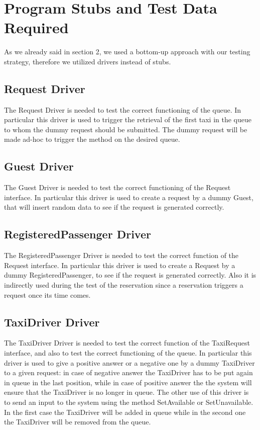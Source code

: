 \section{Program Stubs and Test Data Required}
As we already said in section 2, we used a bottom-up approach with our testing strategy,
therefore we utilized drivers instead of stubs.
\subsection{Request Driver}
The Request Driver is needed to test the correct functioning of the queue. In particular this driver
is used to trigger the retrieval of the first taxi in the queue to whom the dummy request should be
submitted. The dummy request will be made ad-hoc to trigger the method on the desired queue.
\subsection{Guest Driver}
The Guest Driver is needed to test the correct functioning of the Request interface. In particular
this driver is used to create a request by a dummy Guest, that will insert random data to see if the request
is generated correctly.
\subsection{RegisteredPassenger Driver}
The RegisteredPassenger Driver is needed to test the correct function of the Request interface.
In particular this driver is used to create a Request by a dummy RegisteredPassenger,
to see if the request is generated correctly. Also it is indirectly used during the test of
the reservation since a reservation triggers a request once its time comes.
\subsection{TaxiDriver Driver}
The TaxiDriver Driver is needed to test the correct function of the TaxiRequest interface, and also to
test the correct functioning of the queue. In particular this driver is used to give a positive answer or a negative one
by a dummy TaxiDriver to a given request: in case of negative answer the TaxiDriver has to be put again in queue in the last
position, while in case of positive answer the the system will ensure that the TaxiDriver is no longer in queue.
The other use of this driver is to send an input to the system using the method SetAvailable or SetUnavailable. In the first case
the TaxiDriver will be added in queue while in the second one the TaxiDriver will be removed from the queue.

